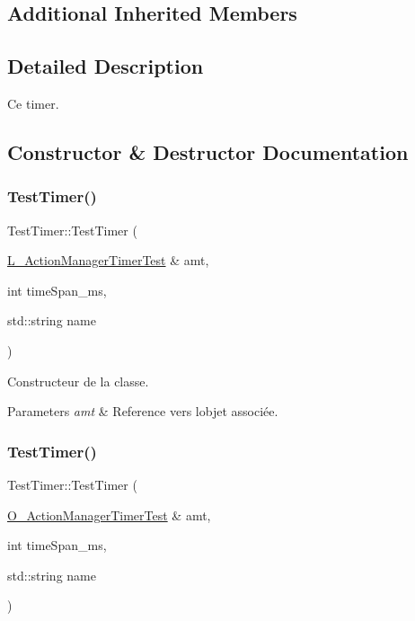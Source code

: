\subsection*{Additional Inherited Members}


\subsection{Detailed Description}
Ce timer. 

\subsection{Constructor \& Destructor Documentation}
\mbox{\label{classTestTimer_a8a2c175537abc63088c9e7dfc3b46979}} 
\subsubsection{\texorpdfstring{Test\+Timer()}{TestTimer()}\hspace{0.1cm}{\footnotesize\ttfamily [1/2]}}
{\footnotesize\ttfamily Test\+Timer\+::\+Test\+Timer (\begin{DoxyParamCaption}\item[{\hyperlink{classL__ActionManagerTimerTest}{L\+\_\+\+Action\+Manager\+Timer\+Test} \&}]{amt,  }\item[{int}]{time\+Span\+\_\+ms,  }\item[{std\+::string}]{name }\end{DoxyParamCaption})}



Constructeur de la classe. 


\begin{DoxyParams}{Parameters}
{\em amt} & Reference vers l\textquotesingle{}objet associée. \\
\hline
\end{DoxyParams}
\mbox{\label{classTestTimer_a7bd3bc501eab8acb36c03dffc677bf32}} 
\subsubsection{\texorpdfstring{Test\+Timer()}{TestTimer()}\hspace{0.1cm}{\footnotesize\ttfamily [2/2]}}
{\footnotesize\ttfamily Test\+Timer\+::\+Test\+Timer (\begin{DoxyParamCaption}\item[{\hyperlink{classO__ActionManagerTimerTest}{O\+\_\+\+Action\+Manager\+Timer\+Test} \&}]{amt,  }\item[{int}]{time\+Span\+\_\+ms,  }\item[{std\+::string}]{name }\end{DoxyParamCaption})}



